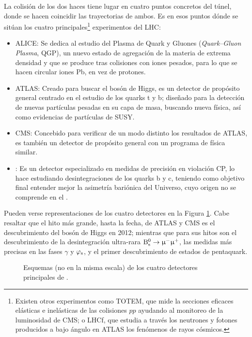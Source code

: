 La colisión de los dos haces tiene lugar en cuatro puntos  concretos del túnel, donde se hacen coincidir las trayectorias de ambos. 
Es en esos puntos dónde se sitúan los cuatro principales\footnote{Existen otros experimentos como TOTEM, que mide la secciones eficaces elásticas e inelásticas de las colisiones $pp$ ayudando al monitoreo de la luminosidad de CMS; o LHCf, que estudia a través los neutrones y fotones producidos a bajo ángulo en ATLAS los fenómenos de rayos cósmicos.} experimentos del LHC:

\begin{itemize}
 \item ALICE: Se dedica al estudio del Plasma de Quark y Gluones (\textit{Quark--Gluon Plasma}, QGP), un nuevo estado de agregación de la materia de extrema densidad y que se produce tras colisiones con iones pesados, para lo que se hacen circular iones Pb, en vez de protones.
 \item ATLAS: Creado para buscar el bosón de Higgs, es un detector de propósito general centrado en el estudio de los quarks t y b; diseñado para la detección de nuevas partículas pesadas en su capa de masa, buscando nueva física, así como evidencias de partículas de SUSY.
 \item CMS: Concebido para verificar de un modo distinto los resultados de ATLAS, es también un detector de propósito general con un programa de física similar.
 \item \lhcb: Es un detector especializado en medidas de precisión en violación CP, lo hace estudiando desintegraciones de los quarks b y c, teniendo como objetivo final entender mejor la asimetría bariónica del Universo, cuyo origen no se comprende en el \stdmod.
\end{itemize}

\color{vero}
Pueden verse representaciones de los cuatro detectores en la Figura \ref{fig_lhcdetect}. Cabe resaltar que el hito más grande, hasta la fecha, de ATLAS y CMS es el descubrimiento del bosón de Higgs en 2012; mientras que para \lhcb sus hitos son el descubrimiento de la desintegración ultra-rara $\text{B}{}_{\text{s}}^{0} \rightarrow \upmu{}^{-} \upmu{}^{+}$, las medidas más precisas en las fases $\gamma$ y $\varphi_{\text{s}}$, y el primer descubrimiento de estados de pentaquark.


\begin{figure}[H]
 \hfill
{} \hfill
%
 \hfill
{} \hfill
\caption{Esquemas (no en la misma escala) de los cuatro detectores principales de \lhc.} \label{fig_lhcdetect}
\end{figure}




